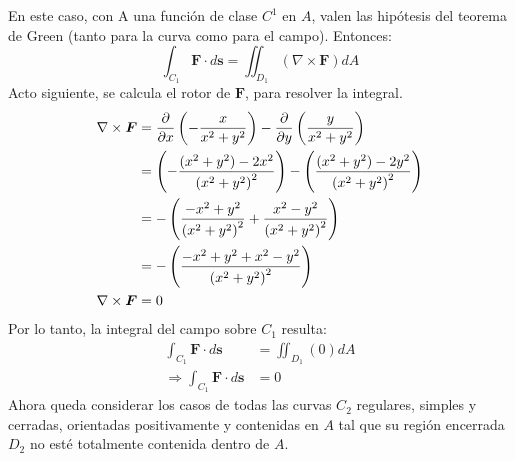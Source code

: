 \begin{solution}
\begin{center}
\begin{tikzpicture}
        \end{tikzpicture}
    \end{center}
    En este caso, con A una función de clase
    $C^1$ en $A$, valen las hipótesis del teorema de Green (tanto para la curva como para el campo). Entonces:
    \begin{equation*}
        \int_{C_1}\boldsymbol{F}\cdot d\boldsymbol{s} = \iint_{D_1}\left(\nabla \times \boldsymbol{F}\right)dA
    \end{equation*}
    Acto siguiente, se calcula el rotor de $\boldsymbol{F}$, para resolver la integral.
    \begin{align*}
        \nabla \times \boldsymbol{F} &= \partialx\left( -\frac{x}{x^2+y^2}\right) - \partialy\left(\frac{y}{x^2+y^2}\right)\\
        &= \left(-\frac{(x^2+y^2)-2x^2}{\left(x^2+y^2\right)^2}\right) - \left(\frac{(x^2+y^2)-2y^2}{\left(x^2+y^2\right)^2}\right)\\
        &= -\left(\frac{-x^2+y^2}{\left(x^2+y^2\right)^2}+\frac{x^2-y^2}{\left(x^2+y^2\right)^2}\right)\\
        &= -\left(\frac{-x^2+y^2+x^2-y^2}{\left(x^2+y^2\right)^2}\right)\\
        \nabla \times \boldsymbol{F}&= 0
    \end{align*}
    Por lo tanto, la integral del campo sobre $C_1$ resulta:
    \begin{align*}
        \int_{C_1}\boldsymbol{F}\cdot d\boldsymbol{s} &= \iint_{D_1}\left(0\right)dA\\
        \Rightarrow \int_{C_1}\boldsymbol{F}\cdot d\boldsymbol{s} &= 0
    \end{align*}
    Ahora queda considerar los casos de todas las curvas $C_2$ regulares, simples y cerradas, orientadas positivamente
    y contenidas en $A$ tal que su región encerrada $D_2$ no esté totalmente contenida dentro de $A$.
    \begin{center}
\end{center}
\end{solution}
